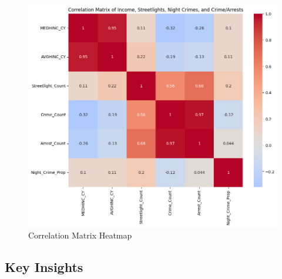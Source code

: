 \documentclass{report}
\begin{document}
\begin{figure}[ht!]
  \begin{center}
    \advance\leftskip-3cm
    \advance\rightskip-3cm
    \includegraphics[keepaspectratio=true,scale=.6]{heatmap}
    \caption{Correlation Matrix Heatmap}
    \label{fig:heatmap}
  \end{center}
\end{figure}

\subsection{Key Insights}
\end{document}
